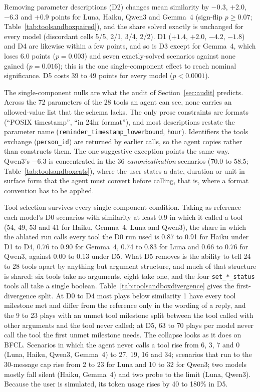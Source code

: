 \documentclass[10pt]{article}
\makeatletter
\renewcommand\paragraph{\@startsection{paragraph}{4}{\z@}{2.0ex plus .5ex minus .2ex}{-1em}{\normalfont\normalsize\bfseries}}
\newcommand{\code}[1]{\texttt{#1}}
\makeatother
\begin{document}
\paragraph{Results.} Removing parameter descriptions (D2) changes mean similarity by $-0.3$, $+2.0$, $-6.3$ and $+0.9$ points for Luna, Haiku, Qwen3 and Gemma~4 (sign-flip $p\geq 0.07$; Table~\ref{tab:toolsandboxpaired}), and the share solved exactly is unchanged for every model (discordant cells 5/5, 2/1, 3/4, 2/2). D1 ($+1.4$, $+2.0$, $-4.2$, $-1.8$) and D4 are likewise within a few points, and so is D3 except for Gemma~4, which loses 6.0 points ($p=0.003$) and seven exactly-solved scenarios against none gained ($p=0.016$); this is the one single-component effect to reach nominal significance. D5 costs 39 to 49 points for every model ($p<0.0001$).

The single-component nulls are what the audit of Section~\ref{sec:audit} predicts. Across the 72 parameters of the 28 tools an agent can see, none carries an allowed-value list that the schema lacks. The only prose constraints are formats (``POSIX timestamp'', ``in 24hr format''), and most descriptions restate the parameter name (\code{reminder\_timestamp\_lowerbound}, \code{hour}). Identifiers the tools exchange (\code{person\_id}) are returned by earlier calls, so the agent copies rather than constructs them. The one suggestive exception points the same way. Qwen3's $-6.3$ is concentrated in the 36 \emph{canonicalization} scenarios (70.0 to 58.5; Table~\ref{tab:toolsandboxcats}), where the user states a date, duration or unit in surface form that the agent must convert before calling, that is, where a format convention has to be applied.

Tool selection survives every single-component condition. Taking as reference each model's D0 scenarios with similarity at least 0.9 in which it called a tool (54, 49, 53 and 41 for Haiku, Gemma~4, Luna and Qwen3), the share in which the ablated run calls every tool the D0 run used is 0.87 to 0.91 for Haiku under D1 to D4, 0.76 to 0.90 for Gemma~4, 0.74 to 0.83 for Luna and 0.66 to 0.76 for Qwen3, against 0.00 to 0.13 under D5. What D5 removes is the ability to tell 24 to 28 tools apart by anything but argument structure, and much of that structure is shared: six tools take no arguments, eight take one, and the four \code{set\_*\_status} tools all take a single boolean. Table~\ref{tab:toolsandboxdivergence} gives the first-divergence split. At D0 to D4 most plays below similarity 1 have every tool milestone met and differ from the reference only in the wording of a reply, and the 9 to 23 plays with an unmet tool milestone split between the tool called with other arguments and the tool never called; at D5, 63 to 70 plays per model never call the tool the first unmet milestone needs. The collapse looks as it does on BFCL. Scenarios in which the agent never calls a tool rise from 6, 3, 7 and 0 (Luna, Haiku, Qwen3, Gemma~4) to 27, 19, 16 and 34; scenarios that run to the 30-message cap rise from 2 to 23 for Luna and 10 to 32 for Qwen3; two models mostly fall silent (Haiku, Gemma~4) and two probe to the limit (Luna, Qwen3). Because the user is simulated, its token usage rises by 40 to 180\% in D5.
\end{document}
